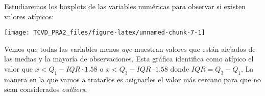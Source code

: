 \documentclass[
]{article}
\newenvironment{Shaded}{\begin{snugshade}}{\end{snugshade}}
\newcommand{\AttributeTok}[1]{\textcolor[rgb]{0.77,0.63,0.00}{#1}}
\newcommand{\ControlFlowTok}[1]{\textcolor[rgb]{0.13,0.29,0.53}{\textbf{#1}}}
\newcommand{\DecValTok}[1]{\textcolor[rgb]{0.00,0.00,0.81}{#1}}
\newcommand{\FloatTok}[1]{\textcolor[rgb]{0.00,0.00,0.81}{#1}}
\newcommand{\FunctionTok}[1]{\textcolor[rgb]{0.00,0.00,0.00}{#1}}
\newcommand{\NormalTok}[1]{#1}
\newcommand{\OtherTok}[1]{\textcolor[rgb]{0.56,0.35,0.01}{#1}}
\newcommand{\SpecialCharTok}[1]{\textcolor[rgb]{0.00,0.00,0.00}{#1}}
\begin{document}
Estudiaremos los boxplots de las variables numéricas para observar si
existen valores atípicos:

\begin{center}\texttt{[image: TCVD\_PRA2\_files/figure-latex/unnamed-chunk-7-1]} \end{center}

Vemos que todas las variables menos \emph{age} muestran valores que
están alejados de las medias y la mayoría de observaciones. Esta gráfica
identifica como atípico el valor que \(x < Q_1 - IQR\cdot 1.58\) o
\(x < Q_3 - IQR\cdot 1.58\) donde \(IQR = Q_3 - Q_1\). La manera en la
que vamos a tratarlos es asignarles el valor más cercano para que no
sean considerados \emph{outliers}.

\begin{Shaded}
\end{Shaded}
\end{document}
